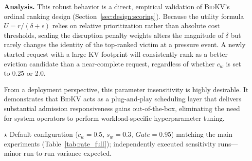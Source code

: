 \documentclass[conference]{IEEEtran}
\newcommand{\bidkv}{\textsc{BidKV}\xspace}
\newcommand{\qualdelta}{\ensuremath{\delta}}
\begin{document}
\textbf{Analysis.} This robust behavior is a direct, empirical validation of \bidkv's ordinal ranking design (Section~\ref{sec:design:scoring}). Because the utility formula $U = r / (\qualdelta + \epsilon)$ relies on relative prioritization rather than absolute cost thresholds, scaling the disruption penalty weights alters the magnitude of $\qualdelta$ but rarely changes the identity of the top-ranked victim at a pressure event. A newly started request with a large KV footprint will consistently rank as a better eviction candidate than a near-complete request, regardless of whether $c_w$ is set to 0.25 or 2.0.

From a deployment perspective, this parameter insensitivity is highly desirable. It demonstrates that \bidkv acts as a plug-and-play scheduling layer that delivers substantial admission responsiveness gains out-of-the-box, eliminating the need for system operators to perform workload-specific hyperparameter tuning.

\begin{table}[h]
\centering
\small
\caption{Robustness to hyperparameter variations (mixed workload, rate\,=\,3.8).
  SLO and TTFT P95 remain stable across the full sweep; $\star$ = default configuration.}
\label{tab:sensitivity}
\vspace{2pt}
{\footnotesize $\star$ Default configuration ($c_w{=}0.5$, $s_w{=}0.3$, $Gate{=}0.95$) matching the main experiments (Table~\ref{tab:rate_full}); independently executed sensitivity runs---minor run-to-run variance expected.}
\end{table}
\end{document}
